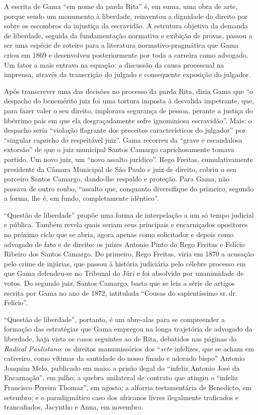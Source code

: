 A escrita de Gama ``em nome da parda Rita'' é, em suma, uma obra de arte,
porque sendo um monumento à liberdade, reinventou a dignidade do direito
por sobre os escombros da injustiça da escravidão. A estrutura objetiva
da demanda de liberdade, seguida da fundamentação normativa e exibição
de provas, passou a ser uma espécie de roteiro para a literatura
normativo-pragmática que Gama criou em 1869 e desenvolveu posteriormente
por toda a carreira como advogado. Um fator a mais entrava na equação: a
discussão da causa processual na imprensa, através da transcrição do
julgado e consequente exposição do julgador.

Após transcrever uma das decisões no processo da parda Rita, dizia Gama
que ``o despacho do benemérito juiz foi uma tortura imposta à desvalida
impetrante, que, para fazer valer o seu direito, implorava segurança de
pessoa, perante a justiça do libérrimo país em que ela desgraçadamente
sofre ignominiosa escravidão''. Mais: o despacho seria ``violação
flagrante dos preceitos característicos do julgador'' por ``singular
capricho do respeitável juiz''. Gama recorreu da ``grave e escandalosa
extorsão'' de que o juiz municipal Santos Camargo caprichosamente tomava
partido. Um novo juiz, um ``novo assalto jurídico''. Rego Freitas,
cumulativamente presidente da Câmara Municipal de São Paulo e juiz de
direito, cobriu o seu parceiro Santos Camargo, dando-lhe respaldo e
proteção. Para Gama, não passava de outro roubo, ``assalto que, conquanto
diversifique do primeiro, segundo a forma, lhe é, em fundo,
completamente idêntico''.

``Questão de liberdade'' propõe uma forma de interpelação a um só
tempo judicial e pública. Também revela quais seriam seus principais e
encarniçados opositores no próximo ciclo que se abria, agora apenas como
solicitador e depois como advogado de fato e de direito: os juízes
Antonio Pinto do Rego Freitas e Felício Ribeiro dos Santos Camargo. Do
primeiro, Rego Freitas, viria em 1870 a acusação pelo crime de injúrias,
que passou à história judiciária pelo célebre processo em que Gama
defendeu-se no Tribunal do Júri e foi absolvido por unanimidade de
votos. Do segundo juiz, Santos Camargo, basta que se leia a série de
artigos escrita por Gama no ano de 1872, intitulada ``Cousas do
sapientíssimo sr.\,dr.\,Felício''.

``Questão de liberdade'', portanto, é um abre-alas para se
compreender a formação das estratégias que Gama empregou na longa
trajetória de advogado da liberdade, haja vista os casos seguintes ao de
Rita, debatidos nas páginas do \emph{Radical Paulistano}: os direitos
manumissórios dos ``\emph{sete} infelizes, que se acham em cativeiro,
como vítimas da santidade do nosso finado e adorado bispo'' Antonio
Joaquim Melo, publicado em maio; a prisão ilegal do ``infeliz Antonio
José da Encarnação'', em julho; a quebra unilateral de contrato que
atingiu o ``infeliz Francisco Pereira Thomaz'', em agosto; a alforria
testamentária de Benedicto, em setembro; e o paradigmático caso dos
africanos livres ilegalmente traficados e trancafiados, Jacyntho e Anna,
em novembro.

